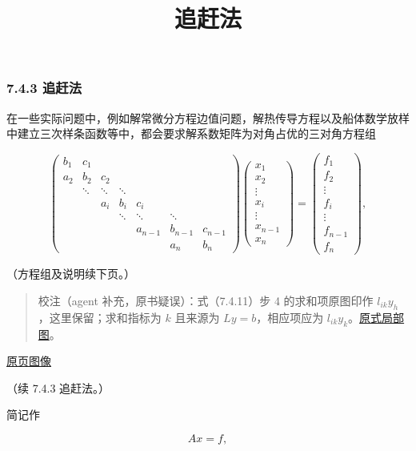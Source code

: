 \documentclass[
  10pt,
  fontset=fandol]{ctexart}
\title{追赶法}
\author{}
\date{}
\begin{document}
\maketitle

\subsubsection{7.4.3 追赶法}\label{ux8ffdux8d76ux6cd5}

在一些实际问题中，例如解常微分方程边值问题，解热传导方程以及船体数学放样中建立三次样条函数等中，都会要求解系数矩阵为对角占优的三对角方程组

\[
\begin{pmatrix}
b_1&c_1&&&&&\\
a_2&b_2&c_2&&&&\\
&\ddots&\ddots&\ddots&&&\\
&&a_i&b_i&c_i&&\\
&&&\ddots&\ddots&\ddots&\\
&&&&a_{n-1}&b_{n-1}&c_{n-1}\\
&&&&&a_n&b_n
\end{pmatrix}
\begin{pmatrix}x_1\\x_2\\\vdots\\x_i\\\vdots\\x_{n-1}\\x_n\end{pmatrix}
=
\begin{pmatrix}f_1\\f_2\\\vdots\\f_i\\\vdots\\f_{n-1}\\f_n\end{pmatrix},
\]

（方程组及说明续下页。）

\begin{quote}
校注（agent 补充，原书疑误）：式（7.4.11）步 4 的求和项原图印作 \(l_{ik}y_h\)，这里保留；求和指标为 \(k\) 且来源为 \(Ly=b\)，相应项应为 \(l_{ik}y_k\)。\href{../assets/ch07b/197-solves.png}{原式局部图}。
\end{quote}

\href{../../source-images/pdf-198.jpeg}{原页图像}

（续 7.4.3 追赶法。）

简记作

\[
Ax=f,
\tag{7.4.12}
\]
\end{document}
